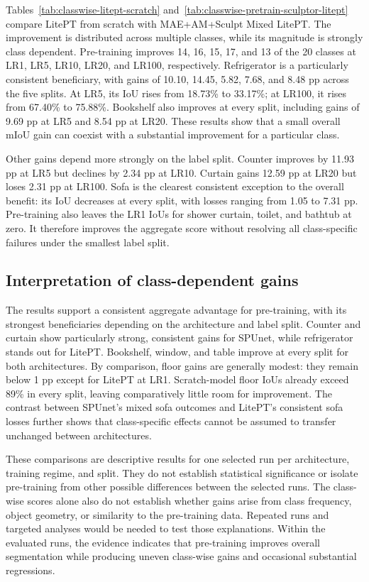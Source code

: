 Tables~\ref{tab:classwise-litept-scratch} and~\ref{tab:classwise-pretrain-sculptor-litept} compare LitePT from scratch with MAE+AM+Sculpt Mixed LitePT. The improvement is distributed across multiple classes, while its magnitude is strongly class dependent. Pre-training improves 14, 16, 15, 17, and 13 of the 20 classes at LR1, LR5, LR10, LR20, and LR100, respectively. Refrigerator is a particularly consistent beneficiary, with gains of 10.10, 14.45, 5.82, 7.68, and 8.48 pp across the five splits. At LR5, its IoU rises from 18.73\% to 33.17\%; at LR100, it rises from 67.40\% to 75.88\%. Bookshelf also improves at every split, including gains of 9.69 pp at LR5 and 8.54 pp at LR20. These results show that a small overall mIoU gain can coexist with a substantial improvement for a particular class.

Other gains depend more strongly on the label split. Counter improves by 11.93 pp at LR5 but declines by 2.34 pp at LR10. Curtain gains 12.59 pp at LR20 but loses 2.31 pp at LR100. Sofa is the clearest consistent exception to the overall benefit: its IoU decreases at every split, with losses ranging from 1.05 to 7.31 pp. Pre-training also leaves the LR1 IoUs for shower curtain, toilet, and bathtub at zero. It therefore improves the aggregate score without resolving all class-specific failures under the smallest label split.




\subsection{Interpretation of class-dependent gains}

The results support a consistent aggregate advantage for pre-training, with its strongest beneficiaries depending on the architecture and label split. Counter and curtain show particularly strong, consistent gains for SPUnet, while refrigerator stands out for LitePT. Bookshelf, window, and table improve at every split for both architectures. By comparison, floor gains are generally modest: they remain below 1 pp except for LitePT at LR1. Scratch-model floor IoUs already exceed 89\% in every split, leaving comparatively little room for improvement. The contrast between SPUnet's mixed sofa outcomes and LitePT's consistent sofa losses further shows that class-specific effects cannot be assumed to transfer unchanged between architectures.

These comparisons are descriptive results for one selected run per architecture, training regime, and split. They do not establish statistical significance or isolate pre-training from other possible differences between the selected runs. The class-wise scores alone also do not establish whether gains arise from class frequency, object geometry, or similarity to the pre-training data. Repeated runs and targeted analyses would be needed to test those explanations. Within the evaluated runs, the evidence indicates that pre-training improves overall segmentation while producing uneven class-wise gains and occasional substantial regressions.
